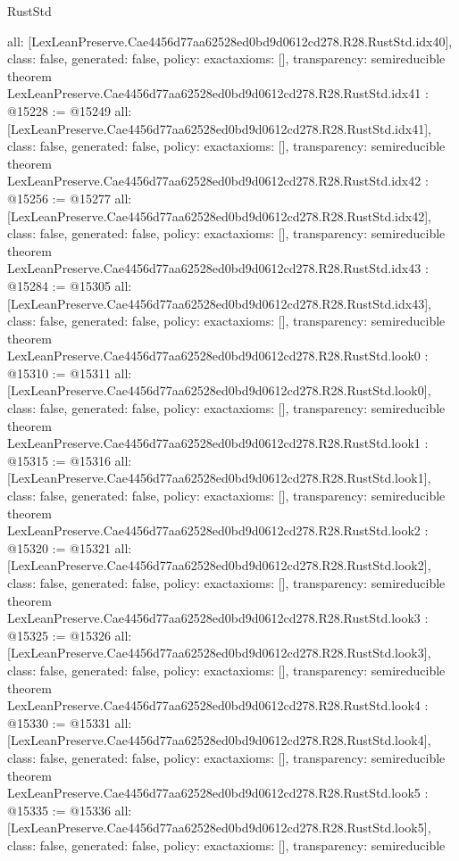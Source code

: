 \begin{lexlean}{RustStd}
\begin{coremodule}
{  all: [LexLeanPreserve.Cae4456d77aa62528ed0bd9d0612cd278.R28.RustStd.idx40],
  class: false,
  generated: false,
  policy: exact{axioms: []},
  transparency: semireducible
}
theorem LexLeanPreserve.Cae4456d77aa62528ed0bd9d0612cd278.R28.RustStd.idx41 : @15228 := @15249 {
  all: [LexLeanPreserve.Cae4456d77aa62528ed0bd9d0612cd278.R28.RustStd.idx41],
  class: false,
  generated: false,
  policy: exact{axioms: []},
  transparency: semireducible
}
theorem LexLeanPreserve.Cae4456d77aa62528ed0bd9d0612cd278.R28.RustStd.idx42 : @15256 := @15277 {
  all: [LexLeanPreserve.Cae4456d77aa62528ed0bd9d0612cd278.R28.RustStd.idx42],
  class: false,
  generated: false,
  policy: exact{axioms: []},
  transparency: semireducible
}
theorem LexLeanPreserve.Cae4456d77aa62528ed0bd9d0612cd278.R28.RustStd.idx43 : @15284 := @15305 {
  all: [LexLeanPreserve.Cae4456d77aa62528ed0bd9d0612cd278.R28.RustStd.idx43],
  class: false,
  generated: false,
  policy: exact{axioms: []},
  transparency: semireducible
}
theorem LexLeanPreserve.Cae4456d77aa62528ed0bd9d0612cd278.R28.RustStd.look0 : @15310 := @15311 {
  all: [LexLeanPreserve.Cae4456d77aa62528ed0bd9d0612cd278.R28.RustStd.look0],
  class: false,
  generated: false,
  policy: exact{axioms: []},
  transparency: semireducible
}
theorem LexLeanPreserve.Cae4456d77aa62528ed0bd9d0612cd278.R28.RustStd.look1 : @15315 := @15316 {
  all: [LexLeanPreserve.Cae4456d77aa62528ed0bd9d0612cd278.R28.RustStd.look1],
  class: false,
  generated: false,
  policy: exact{axioms: []},
  transparency: semireducible
}
theorem LexLeanPreserve.Cae4456d77aa62528ed0bd9d0612cd278.R28.RustStd.look2 : @15320 := @15321 {
  all: [LexLeanPreserve.Cae4456d77aa62528ed0bd9d0612cd278.R28.RustStd.look2],
  class: false,
  generated: false,
  policy: exact{axioms: []},
  transparency: semireducible
}
theorem LexLeanPreserve.Cae4456d77aa62528ed0bd9d0612cd278.R28.RustStd.look3 : @15325 := @15326 {
  all: [LexLeanPreserve.Cae4456d77aa62528ed0bd9d0612cd278.R28.RustStd.look3],
  class: false,
  generated: false,
  policy: exact{axioms: []},
  transparency: semireducible
}
theorem LexLeanPreserve.Cae4456d77aa62528ed0bd9d0612cd278.R28.RustStd.look4 : @15330 := @15331 {
  all: [LexLeanPreserve.Cae4456d77aa62528ed0bd9d0612cd278.R28.RustStd.look4],
  class: false,
  generated: false,
  policy: exact{axioms: []},
  transparency: semireducible
}
theorem LexLeanPreserve.Cae4456d77aa62528ed0bd9d0612cd278.R28.RustStd.look5 : @15335 := @15336 {
  all: [LexLeanPreserve.Cae4456d77aa62528ed0bd9d0612cd278.R28.RustStd.look5],
  class: false,
  generated: false,
  policy: exact{axioms: []},
  transparency: semireducible
}
\end{coremodule}
\end{lexlean}
